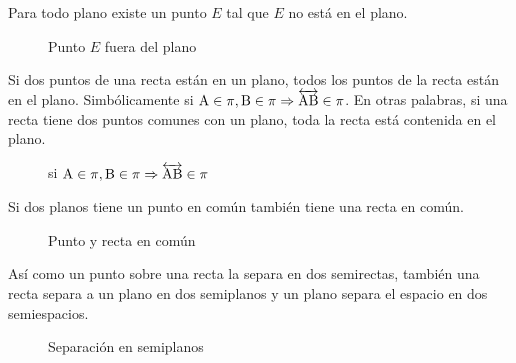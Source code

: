 \begin{postulate}
    Para todo plano existe un punto $E$ tal que $E$ no está en el plano.
    
    \begin{figure}[!h]
        \centering
        
        \caption{Punto $E$ fuera del plano}
        \label{fig:plot7}
    \end{figure}
\end{postulate}

\begin{postulate}
    Si dos puntos de una recta están en un plano, todos los puntos de la recta están en el plano. Simbólicamente si $\rm A \in \pi, \rm B \in \pi \Rightarrow \overleftrightarrow{\rm AB} \in \pi$. En otras palabras, si una recta tiene dos puntos comunes con un plano, toda la recta está contenida en el plano.
    
    \begin{figure}[!h]
        \centering
        
        \caption{si $\rm A \in \pi, \rm B \in \pi \Rightarrow \overleftrightarrow{\rm AB} \in \pi$}
        \label{fig:plot8}
    \end{figure}
    
\end{postulate}

\begin{postulate}
    Si dos planos tiene un punto en común también tiene una recta en común.
    
    \begin{figure}[!h]
        \centering
        
        \caption{Punto y recta en común}
        \label{fig:plot9}
    \end{figure}
    
\end{postulate}

\clearpage

\begin{postulate}
    Así como un punto sobre una recta la separa en dos semirectas, también una recta separa a un plano en dos semiplanos y un plano separa el espacio en dos semiespacios.
    
    \begin{figure}[!h]
        \centering
        
        \caption{Separación en semiplanos}
        \label{fig:plot16}
    \end{figure}
\end{postulate}

